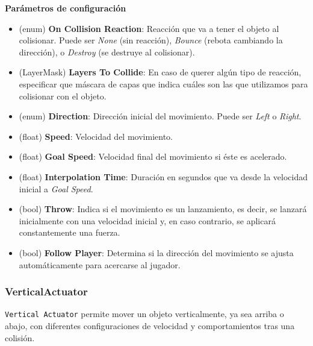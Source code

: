 \textbf{Parámetros de configuración}
\begin{itemize}
	\item (enum) \textbf{On Collision Reaction}: Reacción que va a tener el objeto al colisionar. Puede ser \textit{None} (sin reacción), \textit{Bounce} (rebota cambiando la dirección), o \textit{Destroy} (se destruye al colisionar).
	\item (LayerMask) \textbf{Layers To Collide}: En caso de querer algún tipo de reacción, especificar que máscara de capas que indica cuáles son las que utilizamos para colisionar con el objeto.
	\item (enum) \textbf{Direction}: Dirección inicial del movimiento. Puede ser \textit{Left} o \textit{Right}.
	\item (float) \textbf{Speed}: Velocidad del movimiento.
	\item (float) \textbf{Goal Speed}: Velocidad final del movimiento si éste es acelerado.
	\item (float) \textbf{Interpolation Time}: Duración en segundos que va desde la velocidad inicial a \textit{Goal Speed}.
	\item (bool) \textbf{Throw}: Indica si el movimiento es un lanzamiento, es decir, se lanzará inicialmente con una velocidad inicial y, en caso contrario, se aplicará constantemente una fuerza.
	\item (bool) \textbf{Follow Player}: Determina si la dirección del movimiento se ajusta automáticamente para acercarse al jugador.
\end{itemize}

\subsubsection{VerticalActuator}
\texttt{Vertical Actuator} permite mover un objeto verticalmente, ya sea arriba o abajo, con diferentes configuraciones de velocidad y comportamientos tras una colisión.\\

